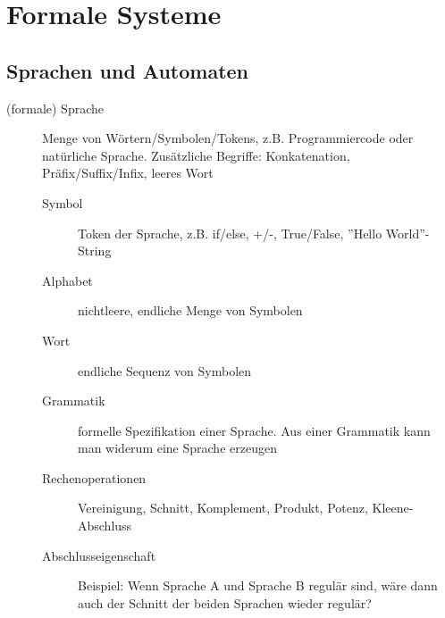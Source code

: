 \documentclass[a4paper,10pt]{article}
\newcommand{\vl}[1]{\colorbox{light-gray}{\textcolor{white}{\textbf{#1}}}}
\begin{document}
    \section{Formale Systeme}
    \subsection{Sprachen und Automaten}

    \begin{description}
        \item[(formale) Sprache] Menge von Wörtern/Symbolen/Tokens, z.B. Programmiercode oder natürliche Sprache.
            Zusätzliche Begriffe: Konkatenation, Präfix/Suffix/Infix, leeres Wort \vl{FS 1}
            \begin{description}
                \item[Symbol] Token der Sprache, z.B. if/else, +/-, True/False, ''Hello World''-String
                \item[Alphabet] nichtleere, endliche Menge von Symbolen
                \item[Wort] endliche Sequenz von Symbolen
                \item[Grammatik] formelle Spezifikation einer Sprache. Aus einer Grammatik kann man widerum eine Sprache erzeugen \vl{FS 2}
                \item[Rechenoperationen] Vereinigung, Schnitt, Komplement, Produkt, Potenz, Kleene-Abschluss
                \item[Abschlusseigenschaft] Beispiel: Wenn Sprache A und Sprache B regulär sind, wäre dann auch der Schnitt der beiden Sprachen wieder regulär? \vl{FS 5}
            \end{description}


\end{description}
\end{document}
